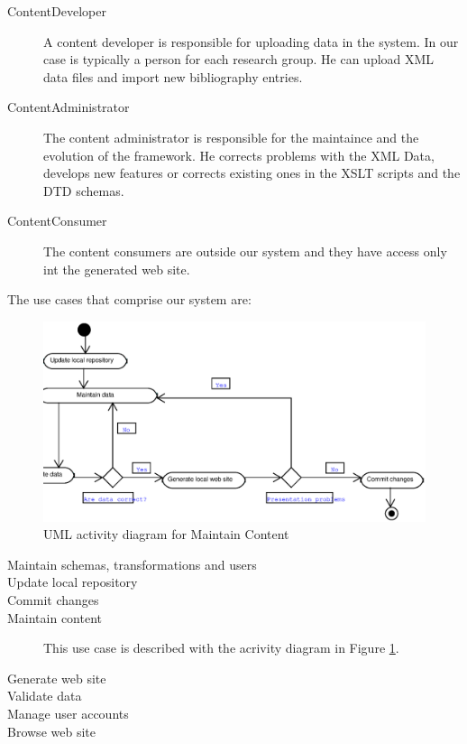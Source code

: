 \documentclass[10pt]{article}
\begin{document}
\begin{description}
\item[ContentDeveloper] A content developer is responsible for uploading data in the system. In our case is typically a person for each research group. He can upload XML data files and import new bibliography entries.

\item[ContentAdministrator] The content administrator is responsible for the maintaince and the evolution of the framework. He corrects problems with the XML Data, develops new features or corrects existing ones in the XSLT scripts and the DTD schemas.

\item[ContentConsumer] The content consumers are outside our system and they have access only int the generated web site.
\end{description}

The use cases that comprise our system are:

\begin{figure}
\includegraphics[scale=0.5]{maintain-content-activity}
\caption{UML activity diagram for Maintain Content}
\label{fig:maintain-content-diagram}
\end{figure}

\begin{description}
\item[Maintain schemas, transformations and users]

\item[Update local repository]

\item[Commit changes]

\item[Maintain content] This use case is described with the acrivity diagram in Figure \ref{fig:maintain-content-diagram}.

\item[Generate web site]

\item[Validate data]

\item[Manage user accounts]

\item[Browse web site]

\end{description}
\end{document}
